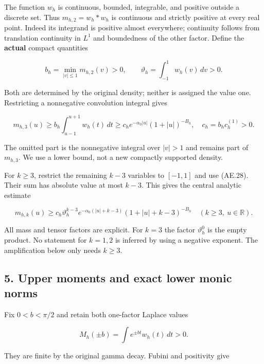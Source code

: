 The function \(w_h\) is continuous, bounded, integrable, and positive
outside a discrete set. Thus \(m_{h,2}=w_h*w_h\) is continuous and
strictly positive at every real point. Indeed its integrand is positive
almost everywhere; continuity follows from translation continuity in
\(L^1\) and boundedness of the other factor. Define the \textbf{actual}
compact quantities

\[
 b_h=\min_{|v|\le1}m_{h,2}(v)>0,\qquad
 \vartheta_h=\int_{-1}^{1}w_h(v)\,dv>0.                                 \tag{AE.27}\label{AE.eq.27}
\]

Both are determined by the original density; neither is assigned the
value one. Restricting a nonnegative convolution integral gives

\[
 m_{h,3}(u)\ge
 b_h\int_{u-1}^{u+1}w_h(t)\,dt
 \ge c_h e^{-\alpha_0|u|}(1+|u|)^{-B_h},\quad c_h=b_hc_h^{(1)}>0.
                                                                         \tag{AE.28}\label{AE.eq.28}
\]

The omitted part is the nonnegative integral over \(|v|>1\) and remains
part of \(m_{h,3}\). We use a lower bound, not a new compactly supported
density.

For \(k\ge3\), restrict the remaining \(k-3\) variables to \([-1,1]\)
and use (AE.28). Their sum has absolute value at most \(k-3\). This gives
the central analytic estimate

\[
 \boxed{
 m_{h,k}(u)\ge
 c_h\vartheta_h^{k-3}
 e^{-\alpha_0(|u|+k-3)}
 (1+|u|+k-3)^{-B_h}
 \quad(k\ge3,\ u\in\mathbb R).}                                       \tag{AE.29}\label{AE.eq.29}
\]

All mass and tensor factors are explicit. For \(k=3\) the factor
\(\vartheta_h^0\) is the empty product. No statement for \(k=1,2\) is
inferred by using a negative exponent. The amplification below only
needs \(k\ge3\).

\subsection*{5. Upper moments and exact lower monic
norms}
\label{AE.upper-moments-and-exact-lower-monic-norms}

Fix \(0<b<\pi/2\) and retain both one-factor Laplace values

\[
 M_h(\pm b)=\int e^{\pm bt}w_h(t)\,dt>0.                               \tag{AE.30}\label{AE.eq.30}
\]

They are finite by the original gamma decay. Fubini and positivity give

